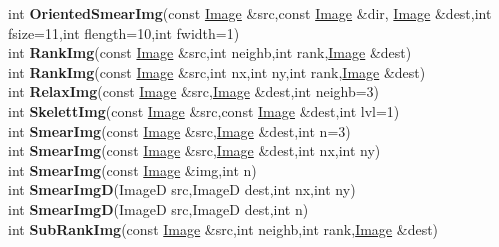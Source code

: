 \documentclass[10pt,titlepage]{article}
\def\functionlistentry#1#2#3#4#5#6{\noindent #1 {\bf #2}(#3) \dotfill #6\\}
\begin{document}
{{\functionlistentry{int}{OrientedSmearImg}{const \hyperlink{Image}{Image} \&src,const \hyperlink{Image}{Image} \&dir, \hyperlink{Image}{Image} \&dest,int fsize=11,int flength=10,int fwidth=1}{364}{filter}{}
\functionlistentry{int}{RankImg}{const \hyperlink{Image}{Image} \&src,int neighb,int rank,\hyperlink{Image}{Image} \&dest}{384}{filter}{}
\functionlistentry{int}{RankImg}{const \hyperlink{Image}{Image} \&src,int nx,int ny,int rank,\hyperlink{Image}{Image} \&dest}{385}{filter}{}
\functionlistentry{int}{RelaxImg}{const \hyperlink{Image}{Image} \&src,\hyperlink{Image}{Image} \&dest,int neighb=3}{388}{filter}{}
\functionlistentry{int}{SkelettImg}{const \hyperlink{Image}{Image} \&src,const \hyperlink{Image}{Image} \&dest,int lvl=1}{389}{filter}{}
\functionlistentry{int}{SmearImg}{const \hyperlink{Image}{Image} \&src,\hyperlink{Image}{Image} \&dest,int n=3}{338}{filter}{}
\functionlistentry{int}{SmearImg}{const \hyperlink{Image}{Image} \&src,\hyperlink{Image}{Image} \&dest,int nx,int ny}{339}{filter}{}
\functionlistentry{int}{SmearImg}{const \hyperlink{Image}{Image} \&img,int n}{340}{filter}{}
\functionlistentry{int}{SmearImgD}{ImageD src,ImageD dest,int nx,int ny}{341}{filter}{}
\functionlistentry{int}{SmearImgD}{ImageD src,ImageD dest,int n}{342}{filter}{}
\functionlistentry{int}{SubRankImg}{const \hyperlink{Image}{Image} \&src,int neighb,int rank,\hyperlink{Image}{Image} \&dest}{387}{filter}{}

}}
\end{document}
